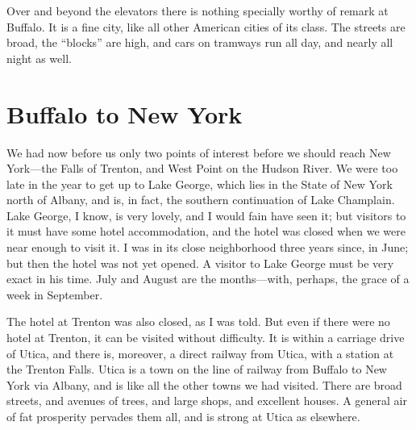 Over and beyond the elevators there is nothing specially worthy of
remark at Buffalo.  It is a fine city, like all other American
cities of its class.  The streets are broad, the ``blocks'' are high,
and cars on tramways run all day, and nearly all night as well.



\chapter{Buffalo to New York}


We had now before us only two points of interest before we should
reach New York---the Falls of Trenton, and West Point on the Hudson
River.  We were too late in the year to get up to Lake George,
which lies in the State of New York north of Albany, and is, in
fact, the southern continuation of Lake Champlain.  Lake George, I
know, is very lovely, and I would fain have seen it; but visitors
to it must have some hotel accommodation, and the hotel was closed
when we were near enough to visit it.  I was in its close
neighborhood three years since, in June; but then the hotel was not
yet opened.  A visitor to Lake George must be very exact in his
time.  July and August are the months---with, perhaps, the grace of
a week in September.

The hotel at Trenton was also closed, as I was told.  But even if
there were no hotel at Trenton, it can be visited without
difficulty.  It is within a carriage drive of Utica, and there is,
moreover, a direct railway from Utica, with a station at the
Trenton Falls.  Utica is a town on the line of railway from Buffalo
to New York via Albany, and is like all the other towns we had
visited.  There are broad streets, and avenues of trees, and large
shops, and excellent houses.  A general air of fat prosperity
pervades them all, and is strong at Utica as elsewhere.

